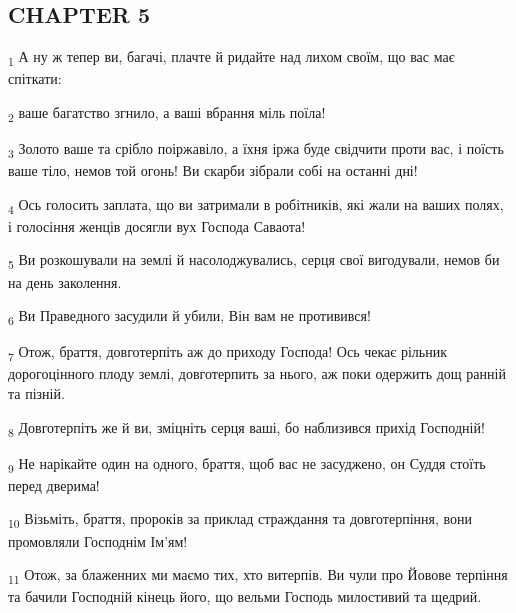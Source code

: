 \subsection{CHAPTER 5}
\begin{tcolorbox}
\textsubscript{1} А ну ж тепер ви, багачі, плачте й ридайте над лихом своїм, що вас має спіткати:
\end{tcolorbox}
\begin{tcolorbox}
\textsubscript{2} ваше багатство згнило, а ваші вбрання міль поїла!
\end{tcolorbox}
\begin{tcolorbox}
\textsubscript{3} Золото ваше та срібло поіржавіло, а їхня іржа буде свідчити проти вас, і поїсть ваше тіло, немов той огонь! Ви скарби зібрали собі на останні дні!
\end{tcolorbox}
\begin{tcolorbox}
\textsubscript{4} Ось голосить заплата, що ви затримали в робітників, які жали на ваших полях, і голосіння женців досягли вух Господа Саваота!
\end{tcolorbox}
\begin{tcolorbox}
\textsubscript{5} Ви розкошували на землі й насолоджувались, серця свої вигодували, немов би на день заколення.
\end{tcolorbox}
\begin{tcolorbox}
\textsubscript{6} Ви Праведного засудили й убили, Він вам не противився!
\end{tcolorbox}
\begin{tcolorbox}
\textsubscript{7} Отож, браття, довготерпіть аж до приходу Господа! Ось чекає рільник дорогоцінного плоду землі, довготерпить за нього, аж поки одержить дощ ранній та пізній.
\end{tcolorbox}
\begin{tcolorbox}
\textsubscript{8} Довготерпіть же й ви, зміцніть серця ваші, бо наблизився прихід Господній!
\end{tcolorbox}
\begin{tcolorbox}
\textsubscript{9} Не нарікайте один на одного, браття, щоб вас не засуджено, он Суддя стоїть перед дверима!
\end{tcolorbox}
\begin{tcolorbox}
\textsubscript{10} Візьміть, браття, пророків за приклад страждання та довготерпіння, вони промовляли Господнім Ім'ям!
\end{tcolorbox}
\begin{tcolorbox}
\textsubscript{11} Отож, за блаженних ми маємо тих, хто витерпів. Ви чули про Йовове терпіння та бачили Господній кінець його, що вельми Господь милостивий та щедрий.
\end{tcolorbox}

